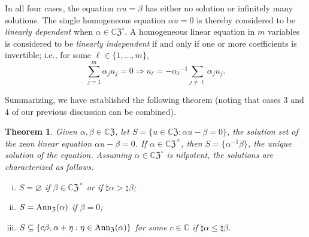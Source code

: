 \documentclass{article}
\newtheorem{theorem}{Theorem}[section]
\theoremstyle{definition}
\newcommand{\CZ}{\mathbb{C}\mathfrak{Z}}
\newcommand{\Z}{\mathfrak{Z}}
\newcommand{\Ann}{{\rm Ann}_\Z}
\numberwithin{equation}{section}
\begin{document}
In all four cases, the equation $\alpha u=\beta$ has either no solution or infinitely many solutions.  The single homogeneous equation $\alpha u=0$ is thereby considered to be {\em linearly dependent} when $\alpha\in\CZ^\circ$.  A homogeneous linear equation in $m$ variables is considered to be {\em linearly independent} if and only if one or more coefficients is invertible; i.e., for some $\ell\in\{1, \ldots, m\}$, \begin{equation*}
\sum_{j=1}^m \alpha_j u_j=0\Rightarrow u_\ell=-{\alpha_\ell}^{-1}\sum_{j\ne \ell}\alpha_j u_j.
\end{equation*}

Summarizing, we have established the following theorem (noting that cases 3 and 4 of our previous discussion can be combined).

\begin{theorem}
Given $\alpha,\beta\in\CZ$, let $S=\{u\in\CZ: \alpha u-\beta=0\}$,  the solution set of the zeon linear equation $\alpha u-\beta=0$.  If $\alpha\in\CZ^\times$, then $S=\{\alpha^{-1}\beta\}$, the unique solution of the equation. Assuming $\alpha\in\CZ^\circ$  is nilpotent, the solutions are characterized as follows.  

\begin{enumerate}[i.]
\item $S=\varnothing$  if $\beta\in\CZ^\times$ or if $\natural\alpha>\natural\beta$;
\item $S= \Ann(\alpha)$ if $\beta=0$;
\item $S\subseteq\{c\beta\llcorner\alpha+\eta: \eta\in\Ann(\alpha)\}$ for some $c\in\mathbb{C}$ if $\natural\alpha\le\natural\beta$.   
\end{enumerate}  
\end{theorem}
\end{document}
